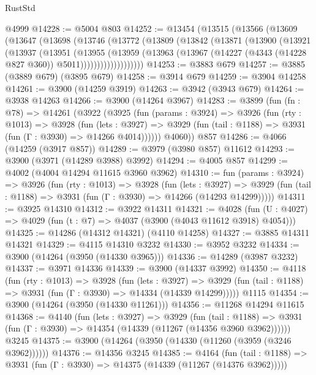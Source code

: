 \begin{lexlean}{RustStd}
\begin{coremodule}
    @4999
@14228 := @5004 @803
@14252 := @13454
    (@13515
      (@13566
        (@13609
          (@13647
            (@13698
              (@13746
                (@13772
                  (@13809
                    (@13842
                      (@13871
                        (@13900
                          (@13921
                            (@13937
                              (@13951
                                (@13955
                                  (@13959
                                    (@13963
                                      (@13967
                                        (@14227 (@4343 (@14228 @827 @360)) @5011)))))))))))))))))))
@14253 := @3883 @679
@14257 := @3885 (@3889 @679) (@3895 @679)
@14258 := @3914 @679
@14259 := @3904 @14258
@14261 := @3900 (@14259 @3919)
@14263 := @3942 (@3943 @679)
@14264 := @3938 @14263
@14266 := @3900 (@14264 @3967)
@14283 := @3899
    (fun (fn : @78) =>
    @14261
      (@3922
        (@3925
          (fun (params : @3924) =>
          @3926
            (fun (rty : @1013) =>
            @3928
              (fun (lets : @3927) =>
              @3929 (fun (tail : @1188) => @3931 (fun (Γ : @3930) => @14266 @4014))))))
        @4060))
    @857
@14286 := @4066 (@14259 (@3917 @857))
@14289 := @3979 (@3980 @857) @11612
@14293 := @3900 (@3971 (@14289 @3988) @3992)
@14294 := @4005 @857
@14299 := @4002 (@4004 @14294 @11615 @3960 @3962)
@14310 := fun (params : @3924) =>
  @3926
    (fun (rty : @1013) =>
    @3928
      (fun (lets : @3927) =>
      @3929 (fun (tail : @1188) => @3931 (fun (Γ : @3930) => @14266 (@14293 @14299)))))
@14311 := @3925 @14310
@14312 := @3922 @14311
@14321 := @4028
    (fun (U : @4027) => @4029 (fun (t : @7) => @4037 (@3900 (@4043 @11612 @3918) @4054)))
@14325 := @14286 (@14312 @14321) (@4110 @14258)
@14327 := @3885 @14311 @14321
@14329 := @4115 @14310 @3232
@14330 := @3952 @3232
@14334 := @3900 (@14264 (@3950 (@14330 @3965)))
@14336 := @14289 (@3987 @3232)
@14337 := @3971 @14336
@14339 := @3900 (@14337 @3992)
@14350 := @4118
    (fun (rty : @1013) =>
    @3928
      (fun (lets : @3927) =>
      @3929 (fun (tail : @1188) => @3931 (fun (Γ : @3930) => @14334 (@14339 @14299)))))
    @1115
@14354 := @3900 (@14264 (@3950 (@14330 @11261)))
@14356 := @11268 @14294 @11615
@14368 := @4140
    (fun (lets : @3927) =>
    @3929
      (fun (tail : @1188) =>
      @3931 (fun (Γ : @3930) => @14354 (@14339 (@11267 (@14356 @3960 @3962))))))
    @3245
@14375 := @3900 (@14264 (@3950 (@14330 (@11260 (@3959 (@3246 @3962))))))
@14376 := @14356 @3245
@14385 := @4164
    (fun (tail : @1188) => @3931 (fun (Γ : @3930) => @14375 (@14339 (@11267 (@14376 @3962)))))

\end{coremodule}
\end{lexlean}
